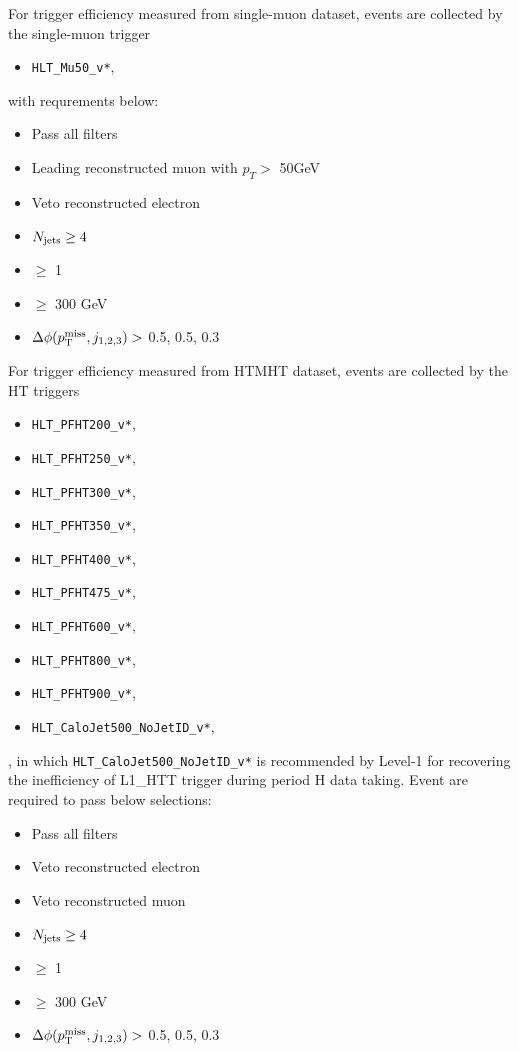 For \MET trigger efficiency measured from single-muon dataset, events are collected by the single-muon trigger
\begin{itemize}
  \item \texttt{HLT\_Mu50\_v*},
\end{itemize}
with requrements below:
\begin{itemize}
  \item Pass all filters
	\item Leading reconstructed muon with $p_{T}>$ 50GeV
  \item Veto reconstructed electron
  \item $N_{\text{jets}}\geq4$
  \item \nbjets $\ge$ 1
  \item \HT $\ge$ 300 GeV
  \item $\Delta\phi(p^{\rm miss}_{\rm T}, j_{1,2,3})>$ 0.5, 0.5, 0.3
\end{itemize}
For \MET trigger efficiency measured from HTMHT dataset, events are
collected by the HT triggers
\begin{itemize}
  \item \texttt{HLT\_PFHT200\_v*},
  \item \texttt{HLT\_PFHT250\_v*},
  \item \texttt{HLT\_PFHT300\_v*},
  \item \texttt{HLT\_PFHT350\_v*},
  \item \texttt{HLT\_PFHT400\_v*},
  \item \texttt{HLT\_PFHT475\_v*},
  \item \texttt{HLT\_PFHT600\_v*},
  \item \texttt{HLT\_PFHT800\_v*},
  \item \texttt{HLT\_PFHT900\_v*},
  \item \texttt{HLT\_CaloJet500\_NoJetID\_v*},
\end{itemize}, 
in which \texttt{HLT\_CaloJet500\_NoJetID\_v*} is recommended by Level-1 for
recovering the inefficiency of L1\_HTT trigger during period H data taking.
Event are required to pass below selections:
\begin{itemize}
  \item Pass all filters
  \item Veto reconstructed electron
  \item Veto reconstructed muon
  \item $N_{\text{jets}}\geq4$
  \item \nbjets $\ge$ 1
  \item \HT $\ge$ 300 GeV
  \item $\Delta\phi(p^{\rm miss}_{\rm T}, j_{1,2,3})>$ 0.5, 0.5, 0.3
\end{itemize}

